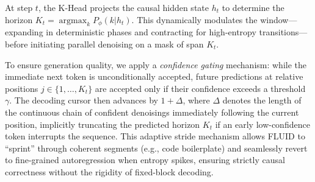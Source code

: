 \documentclass[11pt]{article}
\begin{document}
At step $t$, the K-Head projects the causal hidden state $h_t$ to determine the horizon $K_t = \operatorname*{argmax}_k P_\phi(k|h_t)$. This dynamically modulates the window—expanding in deterministic phases and contracting for high-entropy transitions—before initiating parallel denoising on a mask of span $K_t$.

To ensure generation quality, we apply a \textit{confidence gating} mechanism: while the immediate next token is unconditionally accepted, future predictions at relative positions $j \in \{1, \dots, K_t\}$ are accepted only if their confidence exceeds a threshold $\gamma$. The decoding cursor then advances by $1+\Delta$, where $\Delta$ denotes the length of the continuous chain of confident denoisings immediately following the current position, implicitly truncating the predicted horizon $K_t$ if an early low-confidence token interrupts the sequence.
This adaptive stride mechanism allows FLUID to ``sprint'' through coherent segments (e.g., code boilerplate) and seamlessly revert to fine-grained autoregression when entropy spikes, ensuring strictly causal correctness without the rigidity of fixed-block decoding.
\end{document}
